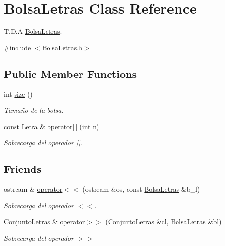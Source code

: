 \hypertarget{classBolsaLetras}{\section{Bolsa\-Letras Class Reference}
\label{classBolsaLetras}
}


T.\-D.\-A \hyperlink{classBolsaLetras}{Bolsa\-Letras}.  




{\ttfamily \#include $<$Bolsa\-Letras.\-h$>$}

\subsection*{Public Member Functions}
\begin{DoxyCompactItemize}
\item 
\hypertarget{classBolsaLetras_a17b1dc9c2da339d92cdbaae5d9a9902d}{int \hyperlink{classBolsaLetras_a17b1dc9c2da339d92cdbaae5d9a9902d}{size} ()}\label{classBolsaLetras_a17b1dc9c2da339d92cdbaae5d9a9902d}

\begin{DoxyCompactList}\small\item\em Tamaño de la bolsa. \end{DoxyCompactList}\item 
const \hyperlink{classLetra}{Letra} \& \hyperlink{classBolsaLetras_a9850b03cd6c7b1f8c874b86a4544fa06}{operator\mbox{[}$\,$\mbox{]}} (int n)
\begin{DoxyCompactList}\small\item\em Sobrecarga del operador \mbox{[}\mbox{]}. \end{DoxyCompactList}\end{DoxyCompactItemize}
\subsection*{Friends}
\begin{DoxyCompactItemize}
\item 
ostream \& \hyperlink{classBolsaLetras_a239ac12c75a924d342c5cc1a9504c7c8}{operator$<$$<$} (ostream \&os, const \hyperlink{classBolsaLetras}{Bolsa\-Letras} \&b\-\_\-l)
\begin{DoxyCompactList}\small\item\em Sobrecarga del operador $<$$<$. \end{DoxyCompactList}\item 
\hyperlink{classConjuntoLetras}{Conjunto\-Letras} \& \hyperlink{classBolsaLetras_ab034eabfb6947531efbcaf79598d7c7a}{operator$>$$>$} (\hyperlink{classConjuntoLetras}{Conjunto\-Letras} \&cl, \hyperlink{classBolsaLetras}{Bolsa\-Letras} \&bl)
\begin{DoxyCompactList}\small\item\em Sobrecarga del operador $>$$>$ \end{DoxyCompactList}\end{DoxyCompactItemize}


